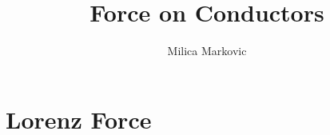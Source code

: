 \documentclass{ximera}
\title{Force on Conductors}
\author{Milica Markovic}
\begin{document}
  
\begin{abstract}  

\end{abstract}  
\maketitle    


\section{Lorenz Force}
\end{document}
